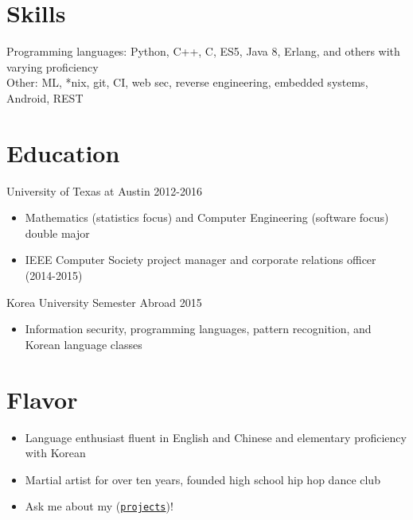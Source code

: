 \documentclass[line,margin]{res}
\begin{document}
\begin{resume}
\vspace{-8pt}
\section{Skills}
    \vspace{12pt} 
    Programming languages: Python, C++, C, ES5, Java 8, Erlang, and others with varying proficiency\\ 
    Other: ML, *nix, git, CI, web sec, reverse engineering, embedded systems, Android, REST


\vspace{-8pt}
\section{Education} 
    \vspace{12pt}
    University of Texas at Austin \hfill 2012-2016 \\
    \vspace{-12pt}
        \begin{itemize} \itemsep -2pt
        \item Mathematics (statistics focus) and Computer Engineering (software focus) double major
        \item IEEE Computer Society project manager and corporate relations officer (2014-2015)
        \end{itemize}
     
    \vspace{-8pt}
    Korea University Semester Abroad \hfill 2015 \\
    \vspace{-12pt}
        \begin{itemize} \itemsep -2pt
        \item Information security, programming languages, pattern recognition, and Korean language classes
        \end{itemize}

\vspace{-8pt}
\section{Flavor} 
    \vspace{22pt}
        \begin{itemize} \itemsep -2pt
        \item Language enthusiast fluent in English and Chinese and elementary proficiency with Korean
        \item Martial artist for over ten years, founded high school hip hop dance club
        \item Ask me about my (\href{https://www.github.com/JDongian}{\texttt{projects}})!
        \end{itemize}

\end{resume} 
\end{document}
